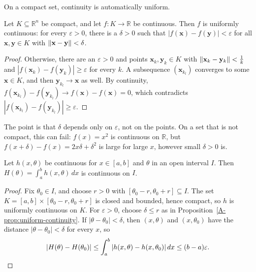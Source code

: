 On a compact set, continuity is automatically uniform.

\begin{proposition}\label{A-prop:uniform-continuity}
    Let $K \subseteq \mathbb{R}^n$ be compact, and let $f: K \to \mathbb{R}$ be continuous. Then $f$ is uniformly continuous: for every $\varepsilon > 0$, there is a $\delta > 0$ such that $|f(\mathbf{x}) - f(\mathbf{y})| < \varepsilon$ for all $\mathbf{x}, \mathbf{y} \in K$ with $\lVert \mathbf{x} - \mathbf{y} \rVert < \delta$.
\end{proposition}

\begin{proof}
    Otherwise, there are an $\varepsilon > 0$ and points $\mathbf{x}_k, \mathbf{y}_k \in K$ with $\lVert \mathbf{x}_k - \mathbf{y}_k \rVert < \frac{1}{k}$ and $|f(\mathbf{x}_k) - f(\mathbf{y}_k)| \geq \varepsilon$ for every $k$. A subsequence $(\mathbf{x}_{k_l})$ converges to some $\mathbf{x} \in K$, and then $\mathbf{y}_{k_l} \to \mathbf{x}$ as well. By continuity, $f(\mathbf{x}_{k_l}) - f(\mathbf{y}_{k_l}) \to f(\mathbf{x}) - f(\mathbf{x}) = 0$, which contradicts $|f(\mathbf{x}_{k_l}) - f(\mathbf{y}_{k_l})| \geq \varepsilon$.
\end{proof}

The point is that $\delta$ depends only on $\varepsilon$, not on the points. On a set that is not compact, this can fail: $f(x) = x^2$ is continuous on $\mathbb{R}$, but $f(x + \delta) - f(x) = 2x\delta + \delta^2$ is large for large $x$, however small $\delta > 0$ is.

\begin{corollary}\label{A-cor:parameter-integrals}
    Let $h(x, \theta)$ be continuous for $x \in [a, b]$ and $\theta$ in an open interval $I$. Then $H(\theta) = \int_a^b h(x, \theta)\, dx$ is continuous on $I$.
\end{corollary}

\begin{proof}
    Fix $\theta_0 \in I$, and choose $r > 0$ with $[\theta_0 - r, \theta_0 + r] \subseteq I$. The set $K = [a, b] \times [\theta_0 - r, \theta_0 + r]$ is closed and bounded, hence compact, so $h$ is uniformly continuous on $K$. For $\varepsilon > 0$, choose $\delta \leq r$ as in Proposition~\ref{A-prop:uniform-continuity}. If $|\theta - \theta_0| < \delta$, then $(x, \theta)$ and $(x, \theta_0)$ have the distance $|\theta - \theta_0| < \delta$ for every $x$, so
    \[|H(\theta) - H(\theta_0)| \leq \int_a^b |h(x, \theta) - h(x, \theta_0)|\, dx \leq (b - a)\varepsilon. \qedhere\]
\end{proof}

